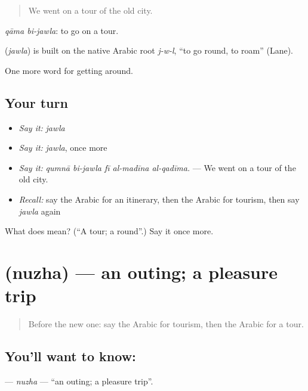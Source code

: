 \begin{quote}
We went on a tour of the old city.
\end{quote}

\emph{qāma bi-jawla}: to go on a tour.

\begin{cousinweb}
\textbf{} (\emph{jawla}) is built on the native Arabic root \emph{j-w-l}, \textquotedblleft{}to go round, to roam\textquotedblright{} (Lane).
\end{cousinweb}

\begin{grammarlens}[title={What you've built}]
One more word for getting around.
\end{grammarlens}

\subsection*{Your turn}
\begin{itemize}
\raggedright
  \item \emph{Say it:} \emph{jawla}
  \item \emph{Say it:} \emph{jawla}, once more
  \item \emph{Say it:} \emph{qumnā bi-jawla fī al-madīna al-qadīma.} — We went on a tour of the old city.
  \item \emph{Recall:} say the Arabic for an itinerary, then the Arabic for tourism, then say \emph{jawla} again
\end{itemize}

\begin{tcolorbox}[breakable,colback=teal!4,colframe=teal!35!black,title={Before you move on}]
What does  mean? (\textquotedblleft{}A tour; a round\textquotedblright{}.) Say it once more.
\end{tcolorbox}
\section[\texorpdfstring{\ar{نزهة} (nuzha)}{نزهة (nuzha)}]{ (nuzha) — an outing; a pleasure trip}

\label{lesson:AR-C438-nuzha}



\begin{quote}
Before the new one: say the Arabic for tourism, then the Arabic for a tour.
\end{quote}

\subsection*{You'll want to know: }
\textbf{} — \emph{nuzha} — \textquotedblleft{}an outing; a pleasure trip\textquotedblright{}.

